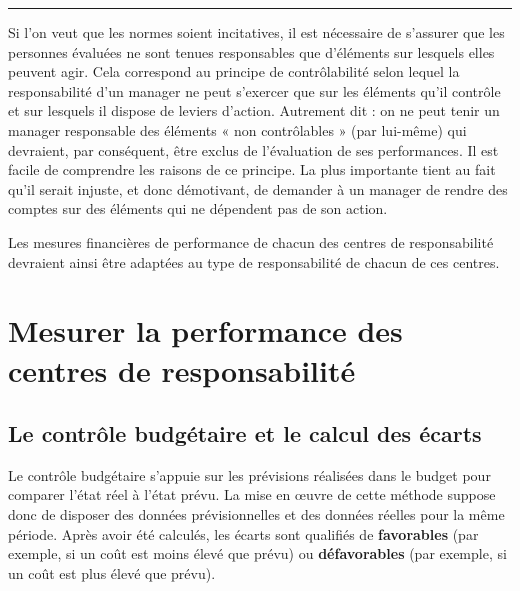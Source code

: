 \documentclass[oneside]{kaobook}
\begin{document}
\noindent\rule{\textwidth}{0.5pt}

Si l’on veut que les normes soient incitatives, il est nécessaire de s’assurer que les personnes évaluées ne sont tenues responsables que d’éléments sur lesquels elles peuvent agir. Cela correspond au principe de contrôlabilité selon lequel la responsabilité d’un manager ne peut s’exercer que sur les éléments qu’il contrôle et sur lesquels il dispose de leviers d’action. Autrement dit : on ne peut tenir un manager responsable des éléments « non contrôlables » (par lui-même) qui devraient, par conséquent, être exclus de l’évaluation de ses performances. Il est facile de comprendre les raisons de ce principe. La plus importante tient au fait qu’il serait injuste, et donc démotivant, de demander à un manager de rendre des comptes sur des éléments qui ne dépendent pas de son action.

Les mesures financières de performance de chacun des centres de responsabilité devraient ainsi être adaptées au type de responsabilité de chacun de ces centres.
\section{Mesurer la performance des centres de responsabilité}
\label{sec:org98915af}
\subsection{Le contrôle budgétaire et le calcul des écarts}
\label{sec:org08377a2}
Le contrôle budgétaire s’appuie sur les prévisions réalisées dans le budget pour comparer l’état réel à l’état prévu. La mise en œuvre de cette méthode suppose donc de disposer des données prévisionnelles et des données réelles pour la même période.
Après avoir été calculés, les écarts sont qualifiés de \textbf{favorables} (par exemple, si un coût est moins élevé que prévu) ou \textbf{défavorables} (par exemple, si un coût est plus élevé que prévu).
\end{document}

